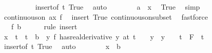 \begin{isabellebody}
\ \ \ \ \ \ \ \ \isamarkupfalse%
\ insert{\isacharparenleft}{\kern0pt}{}{\isacharparenright}{\kern0pt}{\isacharbrackleft}{\kern0pt}of\ t{\isacharbrackright}{\kern0pt}\ True\ \isamarkupfalse%
\ auto\isanewline
\ \ \ \ \ \ \isamarkupfalse%
\ {\isachardoublequoteopen}a\ {\isacharless}{\kern0pt}\ x{\isachardoublequoteclose}\ \isamarkupfalse%
\ True\ \isamarkupfalse%
\ simp\isanewline
\ \ \ \ \ \ \isamarkupfalse%
\ {\isachardoublequoteopen}continuous{\isacharunderscore}{\kern0pt}on\ {\isacharbraceleft}{\kern0pt}a{\isachardot}{\kern0pt}{\isachardot}{\kern0pt}x{\isacharbraceright}{\kern0pt}\ f{\isachardoublequoteclose}\ \isamarkupfalse%
\ insert{\isacharparenleft}{\kern0pt}{}{\isacharparenright}{\kern0pt}\ True\ continuous{\isacharunderscore}{\kern0pt}on{\isacharunderscore}{\kern0pt}subset\ \isamarkupfalse%
\ fastforce\isanewline
\ \ \ \ \isamarkupfalse%
\isanewline
\ \ \ \ \isamarkupfalse%
\ \isamarkupfalse%
\ {\isachardoublequoteopen}{\isasymdots}\ {\isacharless}{\kern0pt}\ f\ b{\isachardoublequoteclose}\isanewline
\ \ \ \ \isamarkupfalse%
\ {\isacharparenleft}{\kern0pt}rule\ insert{\isacharparenleft}{\kern0pt}{}{\isacharparenright}{\kern0pt}{\isacharparenright}{\kern0pt}\isanewline
\ \ \ \ \ \ \isamarkupfalse%
\ {\isachardoublequoteopen}x\ {\isacharless}{\kern0pt}\ t\ {\isasymLongrightarrow}\ t\ {\isacharless}{\kern0pt}\ b\ {\isasymLongrightarrow}\ {\isasymexists}y{\isachardot}{\kern0pt}\ {\isacharparenleft}{\kern0pt}f\ has{\isacharunderscore}{\kern0pt}real{\isacharunderscore}{\kern0pt}derivative\ y{\isacharparenright}{\kern0pt}\ {\isacharparenleft}{\kern0pt}at\ t{\isacharparenright}{\kern0pt}\ {\isasymand}\ {}\ {\isasymle}\ y\ {\isasymand}\ {\isacharparenleft}{\kern0pt}y\ {\isacharequal}{\kern0pt}\ {}\ {\isasymlongrightarrow}\ t\ {\isasymin}\ F{\isacharparenright}{\kern0pt}{\isachardoublequoteclose}\ \ t\isanewline
\ \ \ \ \ \ \ \ \isamarkupfalse%
\ insert{\isacharparenleft}{\kern0pt}{}{\isacharparenright}{\kern0pt}{\isacharbrackleft}{\kern0pt}of\ t{\isacharbrackright}{\kern0pt}\ True\ \isamarkupfalse%
\ auto\isanewline
\ \ \ \ \ \ \isamarkupfalse%
\ {\isachardoublequoteopen}x\ {\isacharless}{\kern0pt}\ b{\isachardoublequoteclose}\ \isamarkupfalse%

\end{isabellebody}
